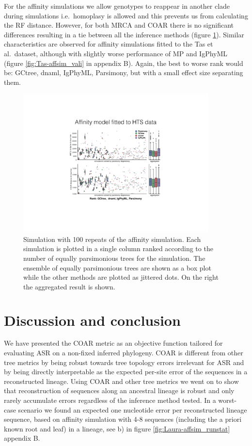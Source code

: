 For the affinity simulations we allow genotypes to reappear in another clade during simulations i.e.\ homoplasy is allowed and this prevents us from calculating the RF distance.
However, for both MRCA and COAR there is no significant differences resulting in a tie between all the inference methods (figure \ref{fig:Laura-affsim_valid}).
Similar characteristics are observed for affinity simulations fitted to the Tas et al.\ dataset, although with slightly worse performance of MP and IgPhyML (figure \ref{fig:Tas-affsim_vali} in appendix B).
Again, the best to worse rank would be: GCtree, dnaml, IgPhyML, Parsimony, but with a small effect size separating them.

\begin{figure}[!ht]
    \centering
    \includegraphics[width=0.9\textwidth]{figures/Laura-affsim_valid.pdf}
    \caption{
        \label{fig:Laura-affsim_valid}
        Simulation with 100 repeats of the affinity simulation.
        Each simulation is plotted in a single column ranked according to the number of equally parsimonious trees for the simulation.
        The ensemble of equally parsimonious trees are shown as a box plot while the other methods are plotted as jittered dots.
        On the right the aggregated result is shown.
    }
\end{figure}





\clearpage
\section{Discussion and conclusion}
We have presented the COAR metric as an objective function tailored for evaluating ASR on a non-fixed inferred phylogeny.
COAR is different from other tree metrics by being robust towards tree topology errors irrelevant for ASR and by being directly interpretable as the expected per-site error of the sequences in a reconstructed lineage.
Using COAR and other tree metrics we went on to show that reconstruction of sequences along an ancestral lineage is robust and only rarely accumulate errors regardless of the inference method tested.
In a worst-case scenario we found an expected one nucleotide error per reconstructed lineage sequence, based on affinity simulation with 4-8 sequences (including the a priori known root and leaf) in a lineage, see b) in figure \ref{fig:Laura-affsim_runstat} appendix B.

